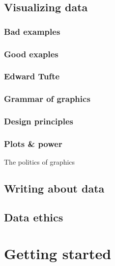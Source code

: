 \documentclass[
]{book}
\begin{document}
\hypertarget{visualizing-data}{%
\chapter{Visualizing data}\label{visualizing-data}}

\hypertarget{bad-examples}{%
\section{Bad examples}\label{bad-examples}}

\hypertarget{good-exaples}{%
\section{Good exaples}\label{good-exaples}}

\hypertarget{edward-tufte}{%
\section{Edward Tufte}\label{edward-tufte}}

\hypertarget{grammar-of-graphics}{%
\section{Grammar of graphics}\label{grammar-of-graphics}}

\hypertarget{design-principles}{%
\section{Design principles}\label{design-principles}}

\hypertarget{plots-power}{%
\section{Plots \& power}\label{plots-power}}

The politics of graphics

\hypertarget{writing-about-data}{%
\chapter{Writing about data}\label{writing-about-data}}

\hypertarget{data-ethics}{%
\chapter{Data ethics}\label{data-ethics}}

\hypertarget{part-getting-started}{%
\part{Getting started}\label{part-getting-started}}
\end{document}
